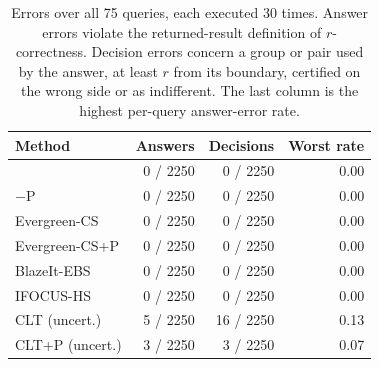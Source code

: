 \begin{table}[t]
\centering
\caption{Errors over all 75 queries, each executed 30 times. Answer errors violate the returned-result definition of $r$-correctness. Decision errors concern a group or pair used by the answer, at least $r$ from its boundary, certified on the wrong side or as indifferent. The last column is the highest per-query answer-error rate.}
\label{tab:validity}
\footnotesize
\begin{tabular}{lrrr}
\toprule
Method & Answers & Decisions & Worst rate \\
\midrule
\sys{} & 0 / 2250 & 0 / 2250 & 0.00 \\
\sys{}$-$P & 0 / 2250 & 0 / 2250 & 0.00 \\
Evergreen-CS & 0 / 2250 & 0 / 2250 & 0.00 \\
Evergreen-CS+P & 0 / 2250 & 0 / 2250 & 0.00 \\
BlazeIt-EBS & 0 / 2250 & 0 / 2250 & 0.00 \\
IFOCUS-HS & 0 / 2250 & 0 / 2250 & 0.00 \\
CLT (uncert.) & 5 / 2250 & 16 / 2250 & 0.13 \\
CLT+P (uncert.) & 3 / 2250 & 3 / 2250 & 0.07 \\
\bottomrule
\end{tabular}
\end{table}